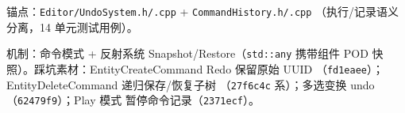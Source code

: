 锚点：\texttt{Editor/UndoSystem.h/.cpp} + \texttt{CommandHistory.h/.cpp}
（执行/记录语义分离，14 单元测试用例）。

机制：命令模式 + 反射系统 Snapshot/Restore（\texttt{std::any} 携带组件
POD 快照）。踩坑素材：EntityCreateCommand Redo 保留原始 UUID
（\texttt{fd1eaee}）；EntityDeleteCommand 递归保存/恢复子树
（\texttt{27f6c4c} 系）；多选变换 undo（\texttt{62479f9}）；Play 模式
暂停命令记录（\texttt{2371ecf}）。

